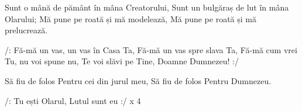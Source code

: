 \beginverse
Sunt o mână de pământ în mâna Creatorului,
Sunt un bulgăraș de lut în mâna Olarului;
Mă pune pe roată și mă modelează,
Mă pune pe roată și mă prelucrează.
\endverse

\beginchorus
/: Fă-mă un vas, un vas în Casa Ta,
Fă-mă un vas spre slava Ta,
Fă-mă cum vrei Tu, nu voi spune nu,
Te voi slăvi pe Tine, Doamne Dumnezeu! :/
\endchorus

\beginverse*
Să fiu de folos
Pentru cei din jurul meu,
Să fiu de folos
Pentru Dumnezeu.
\endverse

\beginverse*
/: Tu ești Olarul,
Lutul sunt eu :/ x 4
\endverse
\endsong